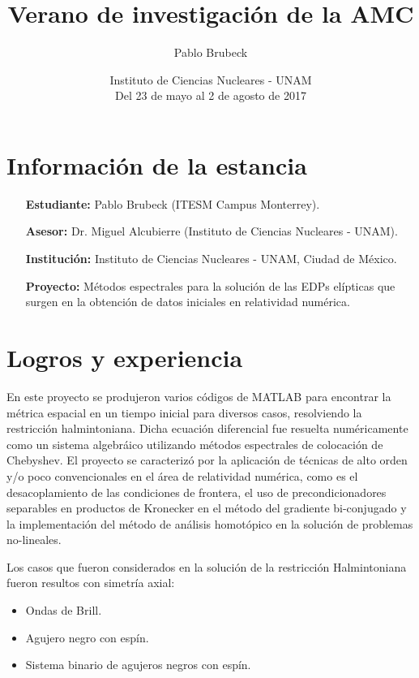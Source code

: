 \documentclass[12pt]{article}
\title{Verano de investigación de la AMC}
\author{Pablo Brubeck}
\date{Instituto de Ciencias Nucleares - UNAM\\Del 23 de mayo al 2 de agosto de 2017}
\begin{document}
\maketitle

\section*{Información de la estancia}
\begin{itemize}
	\item[\textbf{Estudiante:}] Pablo Brubeck (ITESM Campus Monterrey).
	
	\item[\textbf{Asesor:}] Dr. Miguel Alcubierre (Instituto de Ciencias Nucleares - UNAM).
	
	\item[\textbf{Institución:}] Instituto de Ciencias Nucleares - UNAM, Ciudad de México.
	
	\item[\textbf{Proyecto:}] Métodos espectrales para la solución de las EDPs elípticas que surgen en la obtención de datos iniciales en relatividad numérica.
\end{itemize}


\section*{Logros y experiencia}

En este proyecto se produjeron varios códigos de MATLAB para encontrar la métrica espacial en un tiempo inicial para diversos casos, resolviendo la restricción halmintoniana. Dicha ecuación diferencial fue resuelta numéricamente como un sistema algebráico utilizando métodos espectrales de colocación de Chebyshev. El proyecto se caracterizó por la aplicación de técnicas de alto orden y/o poco convencionales en el área de relatividad numérica, como es el desacoplamiento de las condiciones de frontera, el uso de precondicionadores separables en productos de Kronecker en el método del gradiente bi-conjugado y la implementación del método de análisis homotópico en la solución de problemas no-lineales.

Los casos que fueron considerados en la solución de la restricción Halmintoniana fueron resultos con simetría axial:
\begin{itemize}
	\item Ondas de Brill.
	\item Agujero negro con espín.
	\item Sistema binario de agujeros negros con espín.
\end{itemize}
\end{document}
